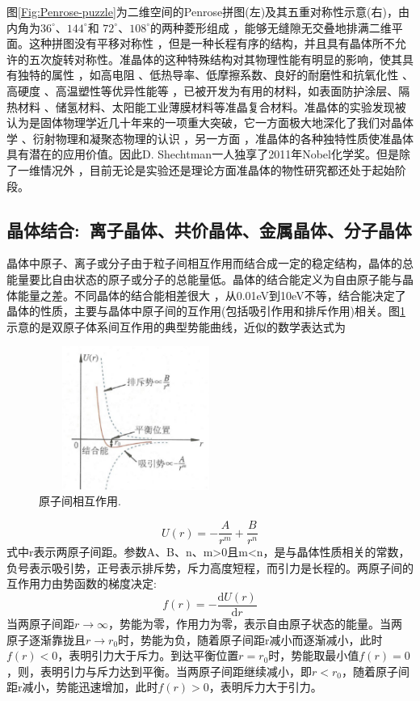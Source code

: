 图\ref{Fig:Penrose-puzzle}为二维空间的Penrose拼图(左)及其五重对称性示意(右)，由内角为$36^{\circ}$、$144^{\circ}$和 $72^{\circ}$、$108^{\circ}$的两种菱形组成 ，能够无缝隙无交叠地排满二维平面。这种拼图没有平移对称性 ，但是一种长程有序的结构，并且具有晶体所不允许的五次旋转对称性。准晶体的这种特殊结构对其物理性能有明显的影响，使其具有独特的属性 ，如高电阻 、低热导率、低摩擦系数、良好的耐磨性和抗氧化性 、高硬度 、高温塑性等优异性能等 ，已被开发为有用的材料，如表面防护涂层、隔热材料 、储氢材料、太阳能工业薄膜材料等准晶复合材料。准晶体的实验发现被认为是固体物理学近几十年来的一项重大突破，它一方面极大地深化了我们对晶体学 、衍射物理和凝聚态物理的认识 ，另一方面 ，准晶体的各种独特性质使准晶体具有潜在的应用价值。因此D. Shechtman一人独享了2011年Nobel化学奖。但是除了一维情况外 ，目前无论是实验还是理论方面准晶体的物性研究都还处于起始阶段。

\subsection{晶体结合:~离子晶体、共价晶体、金属晶体、分子晶体}
晶体中原子、离子或分子由于粒子间相互作用而结合成一定的稳定结构，晶体的总能量要比自由状态的原子或分子的总能量低。晶体的结合能定义为自由原子能与晶体能量之差。不同晶体的结合能相差很大 ，从0.01eV到10eV不等，结合能决定了晶体的性质，主要与晶体中原子间的互作用(包括吸引作用和排斥作用)相关。图\ref{Fig:SSI-04}示意的是双原子体系间互作用的典型势能曲线，近似的数学表达式为
\begin{figure}[h!]
\centering
\vspace*{-0.1in}
\includegraphics[height=1.85in,width=2.5in,viewport=0 0 50 40,clip]{Figures/Interaction-2_Atoms.png}
\caption{\small \textrm{原子间相互作用.}}%
\label{Fig:SSI-04}
\end{figure}
\begin{equation}
	U(r)=-\dfrac{A}{r^m}+\dfrac{B}{r^n}
	\label{eq:SSI-01}
\end{equation}
式中r表示两原子间距。参数A、B、n、m>0且m<n，是与晶体性质相关的常数，负号表示吸引势，正号表示排斥势，斥力高度短程，而引力是长程的。两原子间的互作用力由势函数的梯度决定:
\begin{equation}
	f(r)=-\dfrac{\mathrm{d}U(r)}{\mathrm{d}r}
	\label{eq:SSI-02}
\end{equation}
当两原子间距$r\rightarrow\infty$，势能为零，作用力为零，表示自由原子状态的能量。当两原子逐渐靠拢且$r\rightarrow r_0$时，势能为负，随着原子间距r减小而逐渐减小，此时$f(r)<0$，表明引力大于斥力。到达平衡位置$r=r_0$时，势能取最小值$f(r)=0$，则，表明引力与斥力达到平衡。当两原子间距继续减小，即$r<r_0$，随着原子间距r减小，势能迅速增加，此时$f(r)>0$，表明斥力大于引力。

